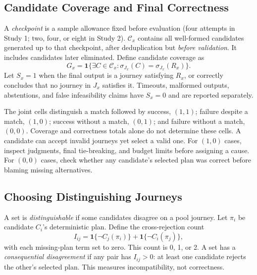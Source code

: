 \documentclass[a4paper,twoside]{article}
\begin{document}
\subsection{Candidate Coverage and Final Correctness}

A \emph{checkpoint} is a sample allowance fixed before evaluation (four attempts in Study 1; two, four, or eight in Study 2). $\mathcal C_x$ contains all well-formed candidates generated up to that checkpoint, after deduplication but \emph{before validation}. It includes candidates later eliminated. Define candidate coverage as
\begin{equation}
 G_x=\mathbf{1}\{\exists C\in\mathcal{C}_x:
                 \sigma_{J_x}(C)=\sigma_{J_x}(R_x)\}.
\end{equation}
Let $S_x=1$ when the final output is a journey satisfying $R_x$, or correctly concludes that no journey in $J_x$ satisfies it. Timeouts, malformed outputs, abstentions, and false infeasibility claims have $S_x=0$ and are reported separately.

The joint cells distinguish a match followed by success, $(1,1)$; failure despite a match, $(1,0)$; success without a match, $(0,1)$; and failure without a match, $(0,0)$. Coverage and correctness totals alone do not determine these cells. A candidate can accept invalid journeys yet select a valid one. For $(1,0)$ cases, inspect judgments, final tie-breaking, and budget limits before assigning a cause. For $(0,0)$ cases, check whether any candidate's selected plan was correct before blaming missing alternatives.

\subsection{Choosing Distinguishing Journeys}

A set is \emph{distinguishable} if some candidates disagree on a pool journey. Let $\pi_i$ be candidate $C_i$'s deterministic plan. Define the cross-rejection count
\begin{equation}
 I_{ij}=\mathbf{1}\{\neg C_j(\pi_i)\}
       +\mathbf{1}\{\neg C_i(\pi_j)\},
\end{equation}
with each missing-plan term set to zero. This count is 0, 1, or 2. A set has a \emph{consequential disagreement} if any pair has $I_{ij}>0$: at least one candidate rejects the other's selected plan. This measures incompatibility, not correctness.
\end{document}
